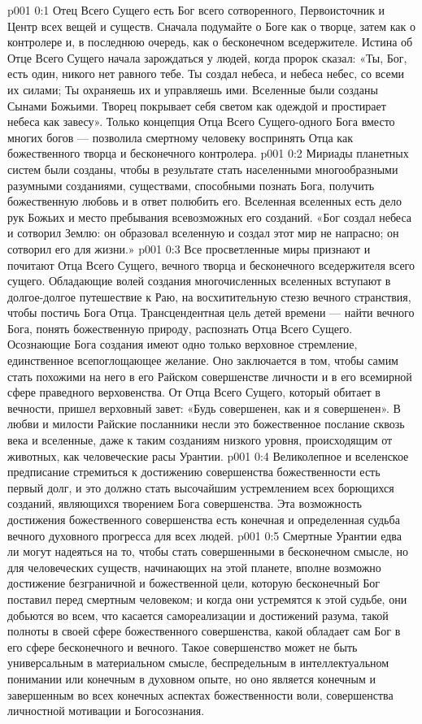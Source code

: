 \vs p001 0:1 Отец Всего Сущего есть Бог всего сотворенного, Первоисточник и Центр всех вещей и существ. Сначала подумайте о Боге как о творце, затем как о контролере и, в последнюю очередь, как о бесконечном вседержителе. Истина об Отце Всего Сущего начала зарождаться у людей, когда пророк сказал: «Ты, Бог, есть один, никого нет равного тебе. Ты создал небеса, и небеса небес, со всеми их силами; Ты охраняешь их и управляешь ими. Вселенные были созданы Сынами Божьими. Творец покрывает себя светом как одеждой и простирает небеса как завесу». Только концепция Отца Всего Сущего\hyp{}одного Бога вместо многих богов --- позволила смертному человеку воспринять Отца как божественного творца и бесконечного контролера.
\vs p001 0:2 Мириады планетных систем были созданы, чтобы в результате стать населенными многообразными разумными созданиями, существами, способными познать Бога, получить божественную любовь и в ответ полюбить его. Вселенная вселенных есть дело рук Божьих и место пребывания всевозможных его созданий. «Бог создал небеса и сотворил Землю: он образовал вселенную и создал этот мир не напрасно; он сотворил его для жизни.»
\vs p001 0:3 Все просветленные миры признают и почитают Отца Всего Сущего, вечного творца и бесконечного вседержителя всего сущего. Обладающие волей создания многочисленных вселенных вступают в долгое\hyp{}долгое путешествие к Раю, на восхитительную стезю вечного странствия, чтобы постичь Бога Отца. Трансцендентная цель детей времени --- найти вечного Бога, понять божественную природу, распознать Отца Всего Сущего. Осознающие Бога создания имеют одно только верховное стремление, единственное всепоглощающее желание. Оно заключается в том, чтобы самим стать похожими на него в его Райском совершенстве личности и в его всемирной сфере праведного верховенства. От Отца Всего Сущего, который обитает в вечности, пришел верховный завет: «Будь совершенен, как и я совершенен». В любви и милости Райские посланники несли это божественное послание сквозь века и вселенные, даже к таким созданиям низкого уровня, происходящим от животных, как человеческие расы Урантии.
\vs p001 0:4 Великолепное и вселенское предписание стремиться к достижению совершенства божественности есть первый долг, и это должно стать высочайшим устремлением всех борющихся созданий, являющихся творением Бога совершенства. Эта возможность достижения божественного совершенства есть конечная и определенная судьба вечного духовного прогресса для всех людей.
\vs p001 0:5 Смертные Урантии едва ли могут надеяться на то, чтобы стать совершенными в бесконечном смысле, но для человеческих существ, начинающих на этой планете, вполне возможно достижение безграничной и божественной цели, которую бесконечный Бог поставил перед смертным человеком; и когда они устремятся к этой судьбе, они добьются во всем, что касается самореализации и достижений разума, такой полноты в своей сфере божественного совершенства, какой обладает сам Бог в его сфере бесконечного и вечного. Такое совершенство может не быть универсальным в материальном смысле, беспредельным в интеллектуальном понимании или конечным в духовном опыте, но оно является конечным и завершенным во всех конечных аспектах божественности воли, совершенства личностной мотивации и Богосознания.
